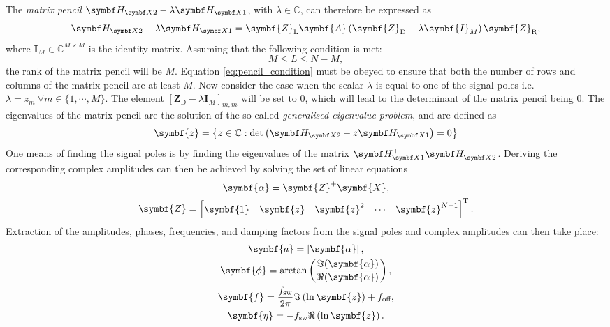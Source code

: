 The \emph{matrix pencil} $\HXtwo - \lambda\HXone$, with $\lambda \in
\mathbb{C}$, can therefore be expressed as
\begin{equation}
    \HXtwo - \lambda \HXone = \symbf{Z}_{\text{L}} \symbf{A} \left(
        \symbf{Z}_{\text{D}} - \lambda \symbf{I}_M
    \right) \symbf{Z}_{\text{R}},
\end{equation}
where $\symbf{I}_M \in \mathbb{C}^{M \times M}$ is the identity matrix.
Assuming that the following condition is met:
\begin{equation}
    M \leq L \leq N - M,\label{eq:pencil_condition}
\end{equation}
the rank of the matrix pencil will be $M$. Equation \eqref{eq:pencil_condition}
must be obeyed to ensure that both the number of rows and columns of the matrix
pencil are at least $M$. Now consider the case when the scalar $\lambda$ is
equal to one of the signal poles i.e.  $\lambda = z_m\ \forall m \in
\lbrace 1, \cdots, M \rbrace$. The element $[\symbf{Z}_{\text{D}} -
\lambda \symbf{I}_M]_{m,m}$ will be set to $0$, which will lead to the
determinant of the matrix pencil being $0$. The eigenvalues of the matrix
pencil are the solution of the so-called \emph{generalised eigenvalue problem},
and are defined as\cite[Section 7.7]{Golub2013}
\begin{equation}
    \symbf{z} = \left\lbrace
        z \in \mathbb{C} : \det\left(\HXtwo - z \HXone\right) = 0
    \right\rbrace
\end{equation}
One means of finding the signal poles is by finding the eigenvalues of the
matrix $\HXone^+ \HXtwo^{\vphantom{+}}$. Deriving the corresponding complex
amplitudes can then be achieved by solving the set of linear equations
\begin{subequations}
    \begin{gather}
        \symbf{\alpha} = \symbf{Z}^+ \symbf{X},\\
        \symbf{Z} =
        \begin{bmatrix}
            \symbf{1} &
            {\symbf{z}} &
            {\symbf{z}}^2 &
            \cdots &
            {\symbf{z}}^{N-1}
        \end{bmatrix}\T.
    \end{gather}
    \label{eq:comp-amps}
\end{subequations}
Extraction of the amplitudes, phases, frequencies, and damping factors from the
signal poles and complex amplitudes can then take place:
\begin{subequations}
    \begin{gather}
        \symbf{a} = \left \lvert \symbf{\alpha} \right \rvert,\\
        \symbf{\phi} = \arctan \left(\frac{\Im (\symbf{\alpha})}{\Re(\symbf{\alpha})}\right),\\
        \symbf{f} = \frac{\fsw}{2 \pi} \Im\left(\ln \symbf{z} \right) + \foff, \\
        \symbf{\eta} = -\fsw \Re\left(\ln \symbf{z}\right).
    \end{gather}
\end{subequations}

